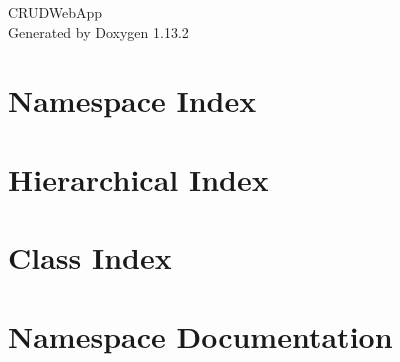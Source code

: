 \documentclass[twoside]{book}
\newcommand{\+}{\discretionary{\mbox{\scriptsize$\hookleftarrow$}}{}{}}
\newcommand{\clearemptydoublepage}{%
    \newpage{\pagestyle{empty}\cleardoublepage}%
  }
\begin{document}
  \raggedbottom
    \hypersetup{pageanchor=false,
                bookmarksnumbered=true,
                pdfencoding=unicode
               }
  \begin{titlepage}
  \vspace*{7cm}
  \begin{center}%
  {\Large CRUDWeb\+App}\\
  \vspace*{1cm}
  {\large Generated by Doxygen 1.13.2}\\
  \end{center}
  \end{titlepage}
  \clearemptydoublepage
  \tableofcontents
  \clearemptydoublepage
  \hypersetup{pageanchor=true}

\chapter{Namespace Index}

\chapter{Hierarchical Index}

\chapter{Class Index}

\chapter{Namespace Documentation}
















\end{document}
